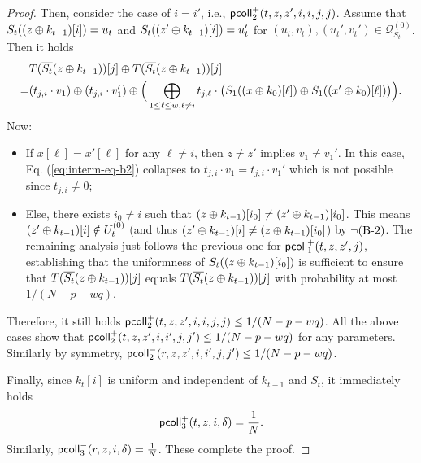 \documentclass[journal=tosc,final,nohyperref]{iacrtrans}
\begin{document}
\begin{proof}
	
	Then, consider the case of $i=i'$, i.e., $\mathsf{pcoll}_{2}^+(t,z,z',i,i,j,j)$. Assume that $S_t((z\oplus k_{t-1})[i])=u_t$ and $S_t((z'\oplus k_{t-1})[i])=u_t'$ for $(u_t,v_t),(u_t',v_t')\in\mathcal{Q}_{S_t}^{(0)}$. Then it holds      {\small
		\begin{align}
		&   T(\overline{S_t}(z\oplus k_{t-1}))[j]\oplus T(\overline{S_t}(z\oplus k_{t-1}))[j]        \notag   \\
		= &
		(t_{j,i}\cdot v_1)
		\oplus
		(t_{j,i}\cdot v_1')
		\oplus
		\Big(\bigoplus_{1\leq\ell\leq w,\ell\neq i}t_{j,\ell}\cdot
		\big(S_1((x\oplus k_0)[\ell])\oplus S_1((x'\oplus k_0)[\ell])\big)\Big)    .
		\label{eq:interm-eq-b2}
		\end{align}
	}%
	Now:
	\begin{itemize}
		\item If $x[\ell]=x'[\ell]$ for any $\ell\neq i$, then $z\neq z'$ implies $v_1\neq v_1'$. In this case, Eq. (\ref{eq:interm-eq-b2}) collapses to $t_{j,i}\cdot v_1=t_{j,i}\cdot v_1'$ which is not possible since $t_{j,i}\neq 0$;
		\item Else, there exists $i_0\neq i$ such that $(z\oplus k_{t-1})[i_0]\neq(z'\oplus k_{t-1})[i_0]$. This means $(z'\oplus k_{t-1})[i]\notin U_t^{(0)}$ (and thus $(z'\oplus k_{t-1})[i]\neq(z\oplus k_{t-1})[i_0]$) by $\neg\text{(B-2)}$. The remaining analysis just follows the previous one for $\mathsf{pcoll}_{1}^+(t,z,z',j)$, establishing that the uniformness of $S_t((z\oplus k_{t-1})[i_0])$ is sufficient to ensure that $T(\overline{S_t}(z\oplus k_{t-1}))[j]$ equals $T(\overline{S_t}(z\oplus k_{t-1}))[j]$ with probability at most $1/(N-p-wq)$.
	\end{itemize}
	Therefore, it still holds $\mathsf{pcoll}_{2}^+(t,z,z',i,i,j,j)\leq1/(N-p-wq)$. All the above cases show that $\mathsf{pcoll}_{2}^+(t,z,z',i,i',j,j')\leq1/(N-p-wq)$ for any parameters. Similarly by symmetry, $\mathsf{pcoll}_{2}^-(r,z,z',i,i',j,j')\leq1/(N-p-wq)$.
	
	
	\arrangespace
	
	
	
	Finally, since $k_t[i]$ is uniform and independent of $k_{t-1}$ and $S_t$, it immediately holds
	$$\mathsf{pcoll}_{3}^+(t,z,i,\delta)=\frac{1}{N}.$$
	Similarly, $\mathsf{pcoll}_{3}^-(r,z,i,\delta)=\frac{1}{N}$. These complete the proof.
\end{proof}
\end{document}
